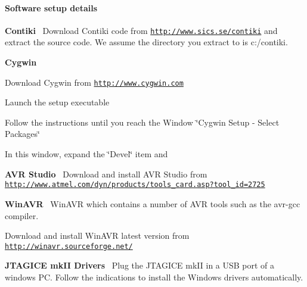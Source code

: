 \hypertarget{a00072_annex_software}{}\paragraph{Software setup details}\label{a00072_annex_software}
{\bfseries Contiki}~\newline
 Download Contiki code from \href{http://www.sics.se/contiki}{\tt http\+://www.\+sics.\+se/contiki} and extract the source code. We assume the directory you extract to is c\+:/contiki.

{\bfseries Cygwin}~\newline
 \begin{DoxyItemize}
\item Download Cygwin from \href{http://www.cygwin.com}{\tt http\+://www.\+cygwin.\+com} \item Launch the setup executable \item Follow the instructions until you reach the Window \char`\"{}\+Cygwin 
\+Setup -\/ Select Packages\char`\"{} \item In this window, expand the \char`\"{}\+Devel\char`\"{} item and\end{DoxyItemize}
{\bfseries A\+VR Studio}~\newline
 Download and install A\+VR Studio from \href{http://www.atmel.com/dyn/products/tools_card.asp?tool_id=2725}{\tt http\+://www.\+atmel.\+com/dyn/products/tools\+\_\+card.\+asp?tool\+\_\+id=2725}

{\bfseries Win\+A\+VR}~\newline
 Win\+A\+VR which contains a number of A\+VR tools such as the avr-\/gcc compiler.

Download and install Win\+A\+VR latest version from \href{http://winavr.sourceforge.net/}{\tt http\+://winavr.\+sourceforge.\+net/}

{\bfseries J\+T\+A\+G\+I\+CE mk\+II Drivers}~\newline
 Plug the J\+T\+A\+G\+I\+CE mk\+II in a U\+SB port of a windows PC. Follow the indications to install the Windows drivers automatically. 